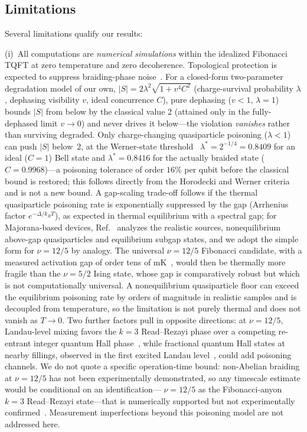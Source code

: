 \documentclass[aps,pra,twocolumn,superscriptaddress,longbibliography,floatfix,nofootinbib]{revtex4-2}
\begin{document}
\subsection{Limitations}

Several limitations qualify our results:

(i)~All computations are \emph{numerical simulations} within the
idealized Fibonacci TQFT at zero temperature and zero decoherence.
Topological protection is expected to suppress braiding-phase
noise~\cite{Nayak2008}. For a closed-form two-parameter degradation
model of our own, $|S| = 2\lambda^2\sqrt{1+v^4 C^2}$ (charge-survival
probability $\lambda$, dephasing visibility $v$, ideal concurrence
$C$), pure dephasing ($v<1$, $\lambda=1$) bounds $|S|$ from below by
the classical value 2 (attained only in the fully-dephased limit
$v\to0$) and never drives it below---the violation \emph{vanishes}
rather than surviving degraded. Only charge-changing quasiparticle poisoning ($\lambda<1$)
can push $|S|$ below~2, at the Werner-state
threshold~\cite{Horodecki1995} $\lambda^\ast=2^{-1/4}=0.8409$ for an
ideal ($C=1$) Bell state and $\lambda^\ast=0.8416$ for the actually
braided state ($C=0.9968$)---a poisoning tolerance of order $16\%$
per qubit before the classical bound is restored; this follows
directly from the Horodecki and Werner criteria and is not a new
bound. A gap-scaling trade-off follows if the thermal quasiparticle
poisoning rate is exponentially suppressed by the gap (Arrhenius factor
$e^{-\Delta/k_BT}$), as expected in thermal equilibrium with a spectral
gap; for Majorana-based devices, Ref.~\cite{KarzigColePikulin2021}
analyzes the realistic sources, nonequilibrium above-gap quasiparticles
and equilibrium subgap states, and we adopt the simple form for
$\nu=12/5$ by analogy. The universal $\nu=12/5$ Fibonacci candidate,
with a measured activation gap of order tens of mK~\cite{Zhang2012},
would then be thermally more fragile than the $\nu=5/2$ Ising state,
whose gap is comparatively robust but which is not computationally
universal. A nonequilibrium quasiparticle floor can
exceed the equilibrium poisoning rate by orders of magnitude in
realistic samples and is decoupled from temperature, so the
limitation is not purely thermal and does not vanish as $T\to 0$.
Two further factors pull in opposite directions: at $\nu=12/5$,
Landau-level mixing favors the $k=3$ Read--Rezayi phase over a competing
re-entrant integer quantum Hall phase~\cite{Mong2017}, while fractional
quantum Hall states at nearby fillings, observed in the first excited
Landau level~\cite{Pan2008}, could add poisoning channels. We do not
quote a specific operation-time bound: non-Abelian braiding at
$\nu=12/5$ has not been experimentally demonstrated, so any
timescale estimate would be conditional on an identification---
$\nu=12/5$ as the Fibonacci-anyon $k=3$ Read--Rezayi
state---that is numerically supported but not experimentally
confirmed~\cite{Mong2017,Zhu2015,Pakrouski2016}. Measurement
imperfections beyond this poisoning model are not addressed here.
\end{document}

